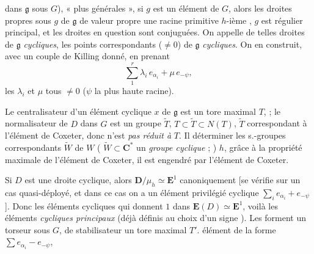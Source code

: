 \documentclass[11pt,a4paper]{article}
\begin{document}


\ill{} dans $\mathfrak{g}$ sous $G$), 
« plus générales », si $g$ est un \ill{} élément 
de $G$, alors les droites propres sous $g$ de $\mathfrak{g}$ de valeur propre
une racine primitive $h$-ième , \struck{\ill{}} $g$ est
régulier principal, et les droites en question sont conjuguées. On appelle de
telles droites de $\mathfrak{g}$ \emph{cycliques}, les points correspondants
($\neq 0$) de $\mathfrak{g}$ \emph{cycliques}. On en construit, avec un couple
de Killing donné, en prenant
\[
  \sum_{1}^{r} \lambda_{i}\, e_{\alpha_{i}} + \mu\, e_{-\psi},
\]
les $\lambda_{i}$ et $\mu$ tous $\neq 0$ ($\psi$ la plus haute racine).

Le centralisateur d'un élément cyclique $x$ de $\mathfrak{g}$ est un tore
maximal $T$,  ; le
normalisateur de $D$ dans $G$ est un groupe $\widetilde{T}$,
$T \subset \widetilde{T} \subset N(T)$, $\widetilde{T}$ correspondant à
l'élément de Coxeter, donc n'est \emph{pas réduit à} $T$. Il 
\struck{\ill{}} déterminer les s.-groupes correspondants
 $\widetilde{W}$ de $W$
(\struck{\ill{}} $\widetilde{W} \subset \mathbf{C}^{*}$ \ill{} un \emph{groupe
cyclique} ; \struck{\ill{}})  $h$, grâce à la propriété
maximale de l'élément de Coxeter, \struck{\ill{}} il est engendré par
l'élément de Coxeter. \ill{}

\struck{\ill{}} Si $D$ est une droite cyclique, alors
$\mathbf{D}/\mu_{h} \simeq \mathbf{E}^{1}$ canoniquement [se vérifie sur un
cas quasi-déployé, et dans ce cas on a un élément privilégié cyclique
 $\sum_{i} e_{\alpha_{i}} + e_{-\psi}$]. Donc
\ill{} les éléments cycliques qui donnent $1$ dans
 $\mathbf{E}(D) \simeq \mathbf{E}^{1}$, \ill{} voilà les
éléments \emph{cycliques principaux} (déjà définis  au
choix d'un signe ). Les  forment un
torseur sous $G$, de stabilisateur un tore maximal $T'$.
 \ill{} élément de la forme
$\sum e_{\alpha_{i}} - e_{-\psi}$, \ill{}
\end{document}
